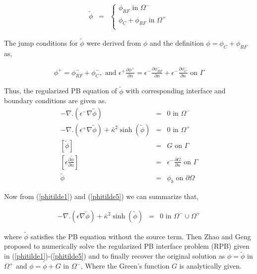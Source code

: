 \begin{eqnarray}
	\tilde{ \phi} &=& \begin{cases}
	\phi_{RF} \text{ in } \Omega^-\\
	\phi_C + \phi_{RF} \text{ in } \Omega^+\\
	\end{cases}
\end{eqnarray}
 
The jump conditions for $\tilde\phi $ were derived from $\phi$ and the definition $\phi=\phi_C+\phi_{RF}$ as,

\begin{eqnarray}
\phi^+=\phi^-_{RF}+\phi^-_C,\text{  and  } \epsilon^+ \frac{\partial \phi^+}{\partial n}=\epsilon^- \frac{\partial \phi^-_{RF}}{\partial n}+\epsilon^- \frac{\partial \phi^-_C}{\partial n} \text{ on } \Gamma
\end{eqnarray}

Thus, the regularized PB equation of $\tilde \phi$ with corresponding interface and boundary conditions are given as. 
\begin{eqnarray}
	-\nabla.(\epsilon^- \nabla \tilde{ \phi}) &=& 0 \text{ in } \Omega^-\\ \label{phitilde1}
	-\nabla.(\epsilon^+ \nabla \tilde{ \phi}) +\bar\kappa^2 \sinh(\tilde{ \phi})&=& 0 \text{ in } \Omega^+\\\label{phitilde2}
	\left[\tilde{ \phi}\right] &=& G \text{ on } \Gamma \\ \label{phitilde3}
	\left[\epsilon\frac{\partial \tilde{ \phi}}{\partial n}\right]&=& \epsilon^-  \frac{\partial G}{\partial n} \text{ on } \Gamma\\\label{phitilde4}
	\tilde{\phi} &=& \phi_b \text{ on } \partial \Omega \label{phitilde5}
\end{eqnarray}	
	


Now from (\ref{phitilde1}) and (\ref{phitilde5}) we can summarize that, 

\begin{eqnarray}
	-\nabla . (\epsilon \nabla \tilde{ \phi}) +\bar\kappa^2 \sinh(\tilde{ \phi})&=& 0 \text{ in } \Omega^-\cup\Omega^+\label{RPB}
\end{eqnarray}
	 
where $\tilde \phi$	 satisfies the PB equation without the source term. Then Zhao and Geng \cite{Geng2017a} proposed to numerically solve the regularized PB interface problem (RPB) given in (\ref{phitilde1})-(\ref{phitilde5}) and to finally recover the original solution as $\phi= \tilde\phi $ in $\Omega^+$ and $\phi = \tilde \phi + G $ in $\Omega^-$, Where the Green's function $G$ is analytically given.

